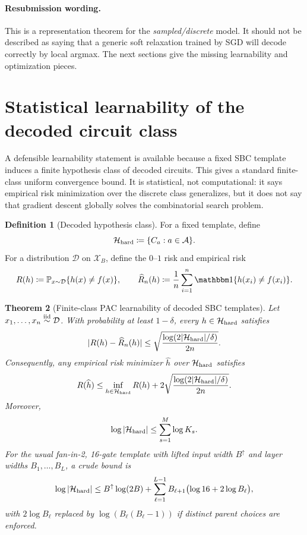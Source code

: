 \documentclass[11pt]{article}
\newtheorem{theorem}{Theorem}[section]
\theoremstyle{definition}
\newtheorem{definition}[theorem]{Definition}
\theoremstyle{remark}
\newcommand{\X}{\mathcal X}
\newcommand{\A}{\mathcal A}
\newcommand{\Hcal}{\mathcal H}
\newcommand{\Dcal}{\mathcal D}
\newcommand{\Pbb}{\mathbb P}
\newcommand{\one}{\mathbbm 1}
\newcommand{\SBC}{\textnormal{\textsc{SBC}}}
\begin{document}
\paragraph{Resubmission wording.}
This is a representation theorem for the \emph{sampled/discrete} model.  It should not be described as saying that a generic soft relaxation trained by SGD will decode correctly by local argmax.  The next sections give the missing learnability and optimization pieces.

\section{Statistical learnability of the decoded circuit class}

A defensible learnability statement is available because a fixed \SBC{} template induces a finite hypothesis class of decoded circuits.  This gives a standard finite-class uniform convergence bound.  It is statistical, not computational: it says empirical risk minimization over the discrete class generalizes, but it does not say that gradient descent globally solves the combinatorial search problem.

\begin{definition}[Decoded hypothesis class]
For a fixed template, define
\[
    \Hcal_{\rm hard}\coloneqq\{C_a:a\in\A\}.
\]
For a distribution $\Dcal$ on $\X_B$, define the $0$--$1$ risk and empirical risk
\[
    R(h)\coloneqq \Pbb_{x\sim\Dcal}\{h(x)\ne f(x)\},
    \qquad
    \widehat R_n(h)\coloneqq \frac1n\sum_{i=1}^n\one\{h(x_i)\ne f(x_i)\}.
\]
\end{definition}

\begin{theorem}[Finite-class PAC learnability of decoded \SBC{} templates]
\label{thm:finite-class-pac}
Let $x_1,\ldots,x_n\overset{\rm iid}{\sim}\Dcal$.  With probability at least $1-\delta$, every $h\in\Hcal_{\rm hard}$ satisfies
\[
    |R(h)-\widehat R_n(h)|
    \le
    \sqrt{\frac{\log(2|\Hcal_{\rm hard}|/\delta)}{2n}}.
\]
Consequently, any empirical risk minimizer $\widehat h$ over $\Hcal_{\rm hard}$ satisfies
\[
    R(\widehat h)
    \le
    \inf_{h\in\Hcal_{\rm hard}} R(h)
    +2\sqrt{\frac{\log(2|\Hcal_{\rm hard}|/\delta)}{2n}}.
\]
Moreover,
\[
    \log|\Hcal_{\rm hard}|
    \le
    \sum_{s=1}^M \log K_s.
\]
For the usual fan-in-2, 16-gate template with lifted input width $B^\uparrow$ and layer widths $B_1,\ldots,B_L$, a crude bound is
\[
\log|\Hcal_{\rm hard}|
\le
B^\uparrow\log(2B)
+
\sum_{\ell=1}^{L-1}B_{\ell+1}\bigl(\log 16+2\log B_\ell\bigr),
\]
with $2\log B_\ell$ replaced by $\log(B_\ell(B_\ell-1))$ if distinct parent choices are enforced.
\end{theorem}
\end{document}
